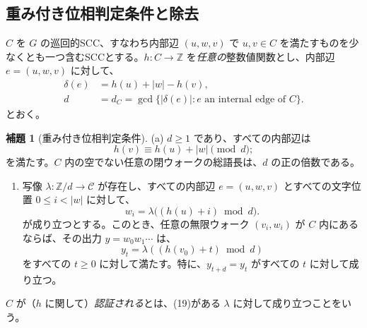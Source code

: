 \documentclass[11pt,reqno]{amsart}
\theoremstyle{definition}
\newtheorem{lemma}[theorem]{補題}
\theoremstyle{definition}
\theoremstyle{remark}
\providecommand{\tightlist}{\setlength{\itemsep}{0pt}\setlength{\parskip}{0pt}}
\begin{document}
\subsection{重み付き位相判定条件と除去}\label{sec:4.2}

\(C\) を \(G\) の巡回的SCC、すなわち内部辺 \((u,w,v)\) で \(u,v\in C\) を満たすものを少なくとも一つ含むSCCとする。\(h:C\to\mathbb Z\) を\emph{任意の}整数値関数とし、内部辺 \(e=(u,w,v)\) に対して、
\[
\begin{aligned}
\delta(e)&=h(u)+|w|-h(v),\\
d&=d_C=\gcd\{|\delta(e)|:e\text{ an internal edge of }C\}.
\end{aligned}
\]
とおく。

\begin{samepage}
\begin{lemma}[重み付き位相判定条件]\leavevmode\label{thm:12}
(a) \(d\ge1\) であり、すべての内部辺は
\[
h(v)\equiv h(u)+|w|\pmod d;
\]
を満たす。\(C\) 内の空でない任意の閉ウォークの総語長は、\(d\) の正の倍数である。

\begin{enumerate}
\def\labelenumi{(\alph{enumi})}
\setcounter{enumi}{1}
\tightlist
\item
  写像 \(\lambda:\mathbb Z/d\to\mathcal C\) が存在し、すべての内部辺 \(e=(u,w,v)\) とすべての文字位置 \(0\le i<|w|\) に対して、
  \[
  w_i=\lambda\bigl((h(u)+i)\bmod d\bigr).
  \tag{19}\label{eq:19}
  \]
  が成り立つとする。このとき、任意の無限ウォーク \((v_i,w_i)\) が \(C\) 内にあるならば、その出力 \(y=w_0w_1\cdots\) は、
  \[
  y_t=\lambda((h(v_0)+t)\bmod d)
  \]
  をすべての \(t\ge0\) に対して満たす。特に、\(y_{t+d}=y_t\) がすべての \(t\) に対して成り立つ。
\end{enumerate}
\label{thm-end:12}
\end{lemma}
\end{samepage}

\(C\) が（\(h\) に関して）\emph{認証される}とは、(19)がある \(\lambda\) に対して成り立つことをいう。
\end{document}

